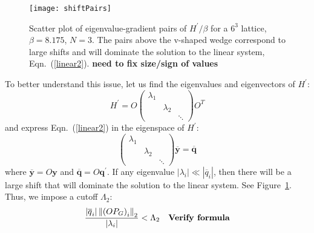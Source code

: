 \documentclass[preprint,aps,prd]{revtex4-2}
\newcommand{\be}{\begin{equation}}
\newcommand{\eq}{\end{equation}}
\begin{document}
\begin{figure}
\texttt{[image: shiftPairs]}
\caption{Scatter plot of eigenvalue-gradient pairs of $H^\prime/\beta$
  for a $6^3$ lattice, $\beta = 8.175$, $N=3$.  The pairs above the
  v-shaped wedge correspond to large shifts and will dominate
  the solution to the linear system, Eqn.~(\ref{linear2}).
  {\bf need to fix size/sign of values}
  \label{shiftPairs}}
\end{figure}

To better understand this issue, let us find the eigenvalues and
eigenvectors of $H^\prime$:
\be
          H^\prime = O \begin{pmatrix}
    \lambda_1 & & \\
    & \lambda_2 & \\
    & & \ddots  \end{pmatrix} O^T
\eq
and express Eqn.~(\ref{linear2}) in the eigenspace of $H^\prime$:
\be
\begin{pmatrix}
    \lambda_1 & & \\
    & \lambda_2 & \\
    & & \ddots  \end{pmatrix} \overline{\mathbf{y}} =
  \overline{\mathbf{q}} \label{linear3}
\eq
where $\overline{\mathbf{y}} = O \mathbf{y}$ and
$\overline{\mathbf{q}}  = O \mathbf{q}^\prime$.
If any eigenvalue $\left|\lambda_i\right|\ll
\left|\overline{q}_i\right|$,
then there will be a large shift that will dominate the solution
to the linear system.  See Figure~\ref{shiftPairs}.
Thus, we impose a cutoff $\Lambda_2$:
\be
    \frac{\left|\overline{q}_i\right|\left\lVert \left(O P_G\right)_i\right\rVert_2}{\left|\lambda_i\right|}
     < \Lambda_2
    \mbox{\quad \bf Verify formula}
\eq
%
\end{document}
